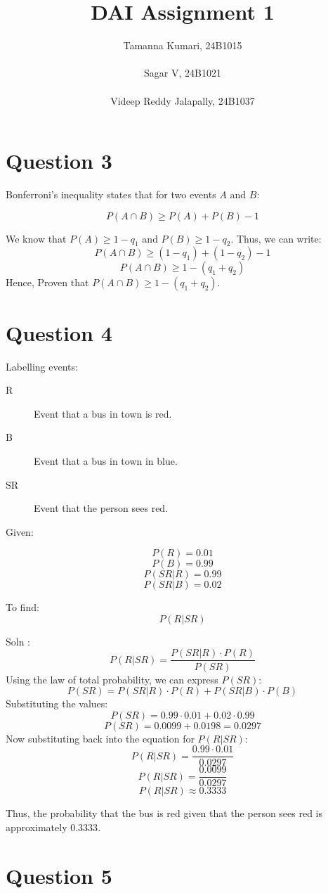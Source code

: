 \documentclass{report}
\title{\Huge DAI Assignment 1}
\author{Tamanna Kumari, 24B1015
\\\\Sagar V, 24B1021
\\\\Videep Reddy Jalapally, 24B1037}
\date{}
\begin{document}
\maketitle

\newpage

\section*{Question 3}

Bonferroni's inequality states that for two events \( A \) and \( B \):

\[P(A \cap B) \geq P(A) + P(B) - 1 \]

We know that \( P(A) \geq 1 - q_1 \) and \( P(B) \geq 1 - q_2\).
Thus, we can write:
\[P(A \cap B) \geq (1 - q_1) + (1 - q_2) - 1\]
\[P(A \cap B) \geq 1 - (q_1 + q_2)\]
 Hence, Proven that \( P(A \cap B) \geq 1 - (q_1 + q_2) \).

\section*{Question 4}

Labelling events: \\
 \begin{description}
\item[R]Event that a bus in town is red.
\item[B] Event that a bus in town in blue.
\item[SR] Event that the person sees red.
 \end{description}

Given: 

\[P(R) = 0.01\] 
\[P(B) = 0.99\] 
\[P(SR | R) = 0.99\]
\[P (SR | B) = 0.02\]

To find: 
\[P ( R | SR )\]

Soln :
\[P ( R | SR) = \frac{P ( SR | R ) \cdot P ( R )}{P ( SR )}\]
Using the law of total probability, we can express \( P(SR) \):
\[P(SR) = P(SR | R) \cdot P(R) + P(SR | B) \cdot P(B)\]
Substituting the values:
\[P(SR) = 0.99 \cdot 0.01 + 0.02 \cdot 0.99\]
\[P(SR) = 0.0099 + 0.0198 = 0.0297\]
Now substituting back into the equation for \( P(R | SR) \):
\[P(R | SR) = \frac{0.99 \cdot 0.01}{0.0297}\]
\[P(R | SR) = \frac{0.0099}{0.0297}\]
\[P(R | SR) \approx 0.3333\]        

Thus, the probability that the bus is red given that the person sees red is approximately \( 0.3333 \).

\section*{Question 5}
\end{document}
